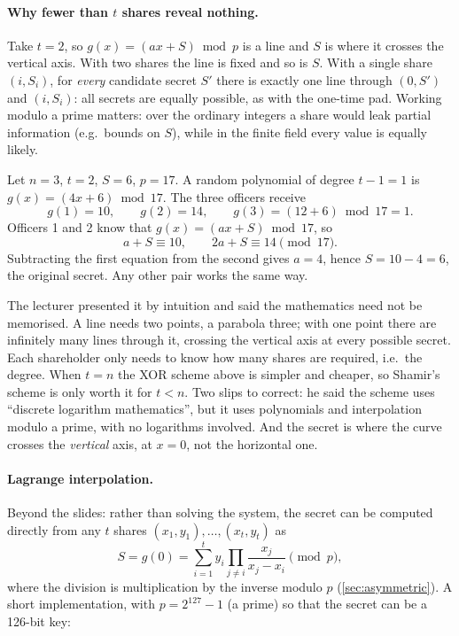 \paragraph{Why fewer than $t$ shares reveal nothing.} Take $t = 2$, so $g(x) = (ax + S) \bmod p$ is a line and $S$ is where it crosses the vertical axis. With two shares the line is fixed and so is $S$. With a single share $(i, S_i)$, for \emph{every} candidate secret $S'$ there is exactly one line through $(0, S')$ and $(i, S_i)$: all secrets are equally possible, as with the one-time pad. Working modulo a prime matters: over the ordinary integers a share would leak partial information (e.g.\ bounds on $S$), while in the finite field every value is equally likely.

\begin{example}
\label{ex:shamir}
Let $n = 3$, $t = 2$, $S = 6$, $p = 17$. A random polynomial of degree $t - 1 = 1$ is $g(x) = (4x + 6) \bmod 17$. The three officers receive
\[
    g(1) = 10, \qquad g(2) = 14, \qquad g(3) = (12 + 6) \bmod 17 = 1.
\]
Officers 1 and 2 know that $g(x) = (ax + S) \bmod 17$, so
\[
    a + S \equiv 10, \qquad 2a + S \equiv 14 \pmod{17}.
\]
Subtracting the first equation from the second gives $a = 4$, hence $S = 10 - 4 = 6$, the original secret. Any other pair works the same way.
\end{example}

\begin{remark}
The lecturer presented it by intuition and said the mathematics need not be memorised. A line needs two points, a parabola three; with one point there are infinitely many lines through it, crossing the vertical axis at every possible secret. Each shareholder only needs to know how many shares are required, i.e.\ the degree. When $t = n$ the XOR scheme above is simpler and cheaper, so Shamir's scheme is only worth it for $t < n$. Two slips to correct: he said the scheme uses \enquote{discrete logarithm mathematics}, but it uses polynomials and interpolation modulo a prime, with no logarithms involved. And the secret is where the curve crosses the \emph{vertical} axis, at $x = 0$, not the horizontal one.
\end{remark}

\paragraph{Lagrange interpolation.} Beyond the slides: rather than solving the system, the secret can be computed directly from any $t$ shares $(x_1, y_1), \dots, (x_t, y_t)$ as
\[
    S = g(0) = \sum_{i=1}^{t} y_i \prod_{j \neq i} \frac{x_j}{x_j - x_i} \pmod p,
\]
where the division is multiplication by the inverse modulo $p$ (\cref{sec:asymmetric}). A short implementation, with $p = 2^{127} - 1$ (a prime) so that the secret can be a 126-bit key:

